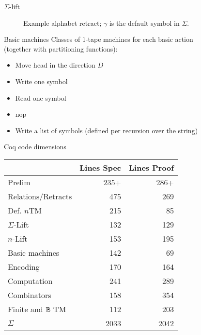 \begin{frame}{$\Sigma$-lift}
  \begin{figure}
    \center%
    \caption{Example alphabet retract; $\gamma$ is the default symbol in $\Sigma$.}
  \end{figure}
\end{frame}

\begin{frame}{Basic machines}
  Classes of $1$-tape machines for each basic action \\(together with partitioning functions):
  \begin{itemize}
    \item Move head in the direction $D$
    \item Write one symbol
    \item Read one symbol
    \item nop
    \pause%
    \item Write a list of symbols (defined per recursion over the string)
  \end{itemize}
\end{frame}

\begin{frame}{Coq code dimensions}
	\begin{table}
		\begin{tabular}{|l|r|r|}
			\hline
			& Lines Spec & Lines Proof\tabularnewline
			\hline
			Prelim & 235+ & 286+\tabularnewline
			Relations/Retracts & 475 & 269\tabularnewline
			Def. $n$TM & 215 & 85\tabularnewline
			$\Sigma$-Lift & 132 & 129\tabularnewline
			$n$-Lift & 153 & 195\tabularnewline
			Basic machines & 142 & 69\tabularnewline
			Encoding & 170 & 164\tabularnewline
			Computation & 241 & 289\tabularnewline
			Combinators & 158 & 354\tabularnewline
			Finite and $\mathbb{B}$ TM & 112 & 203\tabularnewline
			\hline
			$\Sigma$ & 2033 & 2042\tabularnewline
			\hline
		\end{tabular}
	\end{table}
\end{frame}



